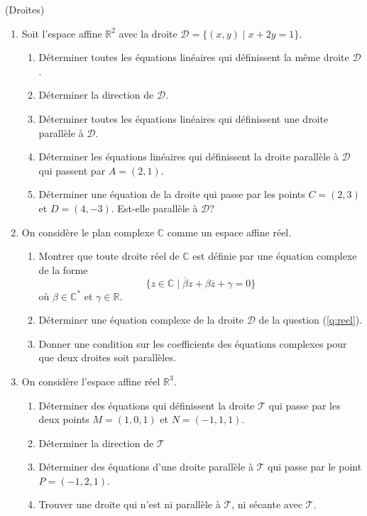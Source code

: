 \documentclass[a4paper,12pt,reqno]{amsart}
\begin{document}


\begin{exo} (Droites)

  \begin{enumerate}
    \item\label{q:reel} Soit l'espace affine $\mathbb{R}^{2}$ avec la droite $\mathcal{D}=\big\{(x,y) \;\big|\; x+2y=1\big\}$.
    \begin{enumerate}
      \item Déterminer toutes les équations linéaires qui définissent la même droite $\mathcal{D}$.
      \item Déterminer la direction de $\mathcal{D}$.
      \item Déterminer toutes les équations linéaires qui définissent une droite parallèle à $\mathcal{D}$.
      \item Déterminer les équations linéaires qui définissent la droite parallèle à $\mathcal{D}$ qui passent par $A=(2,1)$.
      \item Déterminer une équation de la droite qui passe par les points $C=(2,3)$ et $D=(4,-3)$. Est-elle parallèle à $\mathcal{D}$?
    \end{enumerate}
    \item On considère le plan complexe $\mathbb{C}$ comme un espace affine réel.
    \begin{enumerate}
      \item Montrer que toute droite réel de $\mathbb{C}$ est définie par une équation complexe de la forme
        $$
          \big\{z \in \mathbb{C} \;\big|\; \overline{\beta}z+\beta\overline{z}+\gamma=0\big\}
        $$
        où $\beta \in \mathbb{C}^{*}$ et $\gamma \in \mathbb{R}$.
      \item Déterminer une équation complexe de la droite $\mathcal{D}$ de la question (\ref{q:reel}).
      \item Donner une condition sur les coefficients des équations complexes pour que deux droites soit parallèles.
    \end{enumerate}
    \item On considère l'espace affine réel $\mathbb{R}^{3}$.
    \begin{enumerate}
      \item Déterminer des équations qui définissent la droite $\mathcal{T}$ qui passe par les deux points $M=(1,0,1)$ et $N=(-1,1,1)$.
      \item Déterminer la direction de $\mathcal{T}$
      \item Déterminer des équations d'une droite parallèle à $\mathcal{T}$ qui passe par le point $P=(-1,2,1)$.
      \item Trouver une droite qui n'est ni parallèle à $\mathcal{T}$, ni sécante avec $\mathcal{T}$.
    \end{enumerate}
  \end{enumerate}
\end{exo}
\end{document}
